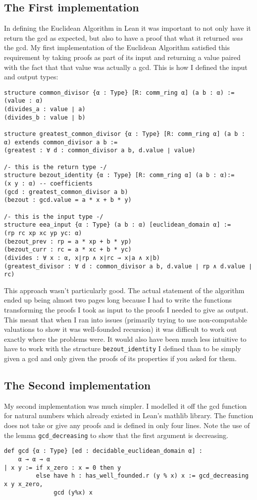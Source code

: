 \documentclass{article}
\newcommand{\ct}{\texttt}
\begin{document}
\subsection{The First implementation}
In defining the Euclidean Algorithm in Lean it was important to not only have it return the gcd as expected, but also to have a proof that what it returned \textit{was} the gcd. 
My first implementation of the Euclidean Algorithm satisfied this requirement by taking proofs as part of its input and returning a value paired with the fact that that value was actually a gcd. 
This is how I defined the input and output types:
\begin{lstlisting}
structure common_divisor {α : Type} [R: comm_ring α] (a b : α) :=
(value : α)
(divides_a : value ∣ a) 
(divides_b : value ∣ b)

structure greatest_common_divisor {α : Type} [R: comm_ring α] (a b : α) extends common_divisor a b :=
(greatest : ∀ d : common_divisor a b, d.value ∣ value)

/- this is the return type -/
structure bezout_identity {α : Type} [R: comm_ring α] (a b : α):= 
(x y : α) -- coefficients
(gcd : greatest_common_divisor a b)
(bezout : gcd.value = a * x + b * y)

/- this is the input type -/
structure eea_input {α : Type} (a b : α) [euclidean_domain α] := 
(rp rc xp xc yp yc: α)
(bezout_prev : rp = a * xp + b * yp)
(bezout_curr : rc = a * xc + b * yc)
(divides : ∀ x : α, x∣rp ∧ x∣rc → x∣a ∧ x∣b)
(greatest_divisor : ∀ d : common_divisor a b, d.value ∣ rp ∧ d.value ∣ rc)
\end{lstlisting}

This approach wasn't particularly good. The actual statement of the algorithm ended up being almost two pages long because I had to write the functions transforming the proofs I took as input to the proofs I needed to give as output. This meant that when I ran into issues (primarily trying to use non-computable valuations to show it was well-founded recursion) it was difficult to work out exactly where the problems were. It would also have been much less intuitive to have to work with the structure \ct{bezout\_identity} I defined than to be simply given a gcd and only given the proofs of its properties if you asked for them.

\subsection{The Second implementation}
My second implementation was much simpler. I modelled it off the gcd function for natural numbers which already existed in Lean's mathlib library. The function does not take or give any proofs and is defined in only four lines. Note the use of the lemma \ct{gcd\_decreasing} to show that the first argument is decreasing.
\begin{lstlisting}
def gcd {α : Type} [ed : decidable_euclidean_domain α] : 
    α → α → α
| x y := if x_zero : x = 0 then y
         else have h : has_well_founded.r (y % x) x := gcd_decreasing x y x_zero,
              gcd (y%x) x
\end{lstlisting}
\end{document}
